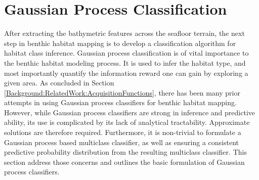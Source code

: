 		

			
				
	\section{Gaussian Process Classification}
	\label{BenthicHabitatMapping:Classification}
	
		After extracting the bathymetric features across the seafloor terrain, the next step in benthic habitat mapping is to develop a classification algorithm for habitat class inference. Gaussian process classification is of vital importance to the benthic habitat modeling process. It is used to infer the habitat type, and most importantly quantify the information reward one can gain by exploring a given area. As concluded in Section \ref{Background:RelatedWork:AcquisitionFunctions}, there has been many prior attempts in using Gaussian process classifiers for benthic habitat mapping. However, while Gaussian process classifiers are strong in inference and predictive ability, its use is complicated by its lack of analytical tractability. Approximate solutions are therefore required. Furthermore, it is non-trivial to formulate a Gaussian process based multiclass classifier, as well as ensuring a consistent predictive probability distribution from the resulting multiclass classifier. This section address those concerns and outlines the basic formulation of Gaussian process classifiers.
		
